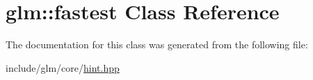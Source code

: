 \hypertarget{classglm_1_1fastest}{\section{glm\-:\-:fastest \-Class \-Reference}
\label{classglm_1_1fastest}
}


\-The documentation for this class was generated from the following file\-:\begin{DoxyCompactItemize}
\item 
include/glm/core/\hyperlink{hint_8hpp}{hint.\-hpp}\end{DoxyCompactItemize}
